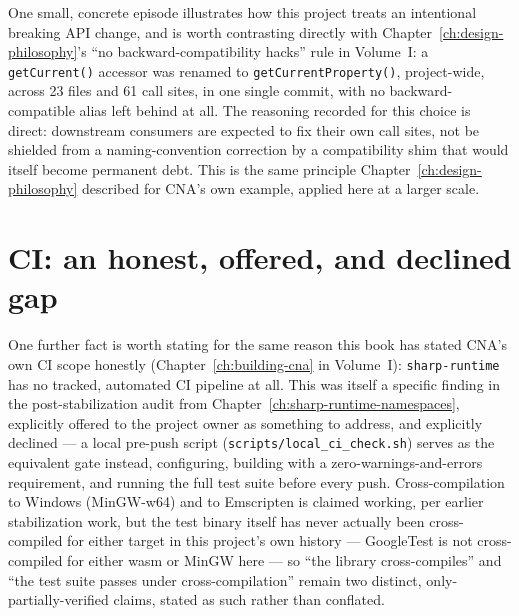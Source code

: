 One small, concrete episode illustrates how this project treats an intentional breaking API
change, and is worth contrasting directly with Chapter~\ref{ch:design-philosophy}'s ``no
backward-compatibility hacks'' rule in Volume~I: a \texttt{getCurrent()} accessor was renamed
to \texttt{getCurrentProperty()}, project-wide, across 23 files and 61 call sites, in one
single commit, with no backward-compatible alias left behind at all. The reasoning recorded
for this choice is direct: downstream consumers are expected to fix their own call sites, not
be shielded from a naming-convention correction by a compatibility shim that would itself
become permanent debt. This is the same principle Chapter~\ref{ch:design-philosophy}
described for CNA's own  example, applied here at a larger
scale.

\section{CI: an honest, offered, and declined gap}

One further fact is worth stating for the same reason this book has stated CNA's own CI scope
honestly (Chapter~\ref{ch:building-cna} in Volume~I): \texttt{sharp-runtime} has no tracked,
automated CI pipeline at all. This was itself a specific finding in the post-stabilization
audit from Chapter~\ref{ch:sharp-runtime-namespaces}, explicitly offered to the project owner
as something to address, and explicitly declined --- a local pre-push script
(\texttt{scripts/local\_ci\_check.sh}) serves as the equivalent gate instead, configuring,
building with a zero-warnings-and-errors requirement, and running the full test suite before
every push. Cross-compilation to Windows (MinGW-w64) and to Emscripten is claimed working, per
earlier stabilization work, but the test binary itself has never actually been cross-compiled
for either target in this project's own history --- GoogleTest is not cross-compiled for
either wasm or MinGW here --- so ``the library cross-compiles'' and ``the test suite passes
under cross-compilation'' remain two distinct, only-partially-verified claims, stated as such
rather than conflated.

